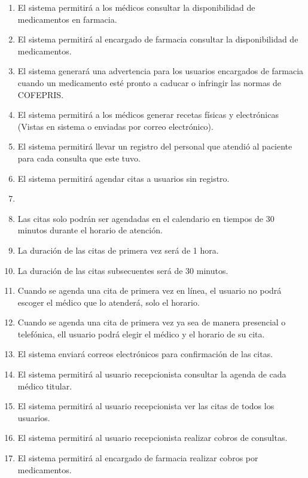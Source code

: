 \documentclass[12pt,letterpaper]{article}
\begin{document}
{{{\begin{itemize}
\begin{enumerate}
                        \item El sistema permitirá a los médicos consultar la disponibilidad de medicamentos en farmacia.
                        \item El sistema permitirá al encargado de farmacia consultar la disponibilidad de medicamentos.
                        \item El sistema generará una advertencia para los usuarios encargados de farmacia cuando un medicamento esté pronto a caducar o infringir las normas de COFEPRIS.
                        \item El sistema permitirá a los médicos generar recetas físicas y electrónicas (Vistas en sistema o enviadas por correo electrónico).
                        \item El sistema permitirá llevar un registro del personal que atendió al paciente para cada consulta que este tuvo.
                        \item El sistema permitirá agendar citas a usuarios sin registro.
                        \item \item Las citas solo podrán ser agendadas en el calendario en tiempos de 30 minutos durante el horario de atención.
                        \item La duración de las citas de primera vez será de 1 hora.
                        \item La duración de las citas  subsecuentes será de 30 minutos.
                        \item Cuando se agenda una cita de primera vez en línea, el usuario no podrá escoger el médico que lo atenderá, solo el horario.
                        \item Cuando se agenda una cita de primera vez ya sea de manera presencial o telefónica, ell usuario podrá elegir el médico y el horario de su cita.
                        \item El sistema enviará correos electrónicos para confirmación de las citas.
                        \item El sistema permitirá al usuario recepcionista consultar la agenda de cada médico titular.
                        \item El sistema permitirá al usuario recepcionista ver las citas de todos los usuarios.
                        \item El sistema permitirá al usuario recepcionista realizar cobros de consultas.
                        \item El sistema permitirá al encargado de farmacia realizar cobros por medicamentos.

\end{enumerate}
\end{itemize}}}}
\end{document}
